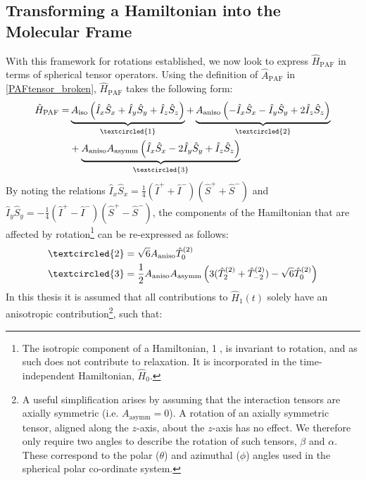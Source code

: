 \subsection{Transforming a Hamiltonian into the Molecular Frame}
With this framework for rotations established, we now look to express $\hat{H}_{\text{PAF}}$ in terms of spherical tensor operators. Using the definition of $\hat{A}_{\text{PAF}}$ in \ref{PAFtensor_broken}, $\hat{H}_{\text{PAF}}$ takes the following form:
\begin{equation}
\begin{split}
\hat{H}_{\text{PAF}} = &\underbrace{A_{\text{iso}}\left(\hat{I}_x \hat{S}_x + \hat{I}_y \hat{S}_y + \hat{I}_z \hat{S}_z\right)}_{\tiny\textcircled{1}}  + \underbrace{A_{\text{aniso}}\left(-\hat{I}_x \hat{S}_x - \hat{I}_y \hat{S}_y + 2\hat{I}_z \hat{S}_z\right)}_{\tiny\textcircled{2}} \\ &+ \underbrace{A_{\text{aniso}} A_{\text{asymm}} \left(\hat{I}_x \hat{S}_x - 2\hat{I}_y \hat{S}_y + \hat{I}_z \hat{S}_z\right)}_{\tiny\textcircled{3}}
\end{split}
\end{equation}
By noting the relations $\hat{I}_x \hat{S}_x = \frac{1}{4}\left(\hat{I}^+ + \hat{I}^-\right)\left(\hat{S}^+ + \hat{S}^-\right)$ and \\$\hat{I}_y \hat{S}_y = -\frac{1}{4}\left(\hat{I}^+  - \hat{I}^-\right)\left(\hat{S}^+ - \hat{S}^-\right)$, the components of the Hamiltonian that are affected by rotation\footnote{The isotropic component of a Hamiltonian, \textcircled{1}, is invariant to rotation, and as such does not contribute to relaxation. It is incorporated in the time-independent Hamiltonian, $\hat{H}_0$.} can be re-expressed as follows:
\begin{equation}
\begin{split}
&\textcircled{2} =\sqrt{6}A_{\text{aniso}}\hat{T}_0^{(2)} \\
&\textcircled{3} = \frac{1}{2} A_{\text{aniso}} A_{\text{asymm}} \left(3 (\hat{T}_2^{(2)} + \hat{T}_{-2}^{(2)}) - \sqrt{6} \hat{T}_0^{(2)} \right)
\end{split}
\end{equation}
In this thesis it is assumed that all contributions to $\hat{H}_1 (t)$ solely have an anisotropic contribution\footnote{A useful simplification arises by assuming that the interaction tensors are axially symmetric (i.e. $A_{\text{asymm}} = 0$). A rotation of an axially symmetric tensor, aligned along the $z$-axis, about the $z$-axis has no effect. We therefore only require two angles to describe the rotation of such tensors, $\beta$ and $\alpha$. These correspond to the polar ($\theta$) and azimuthal ($\phi$) angles used in the spherical polar co-ordinate system.}, such that:
